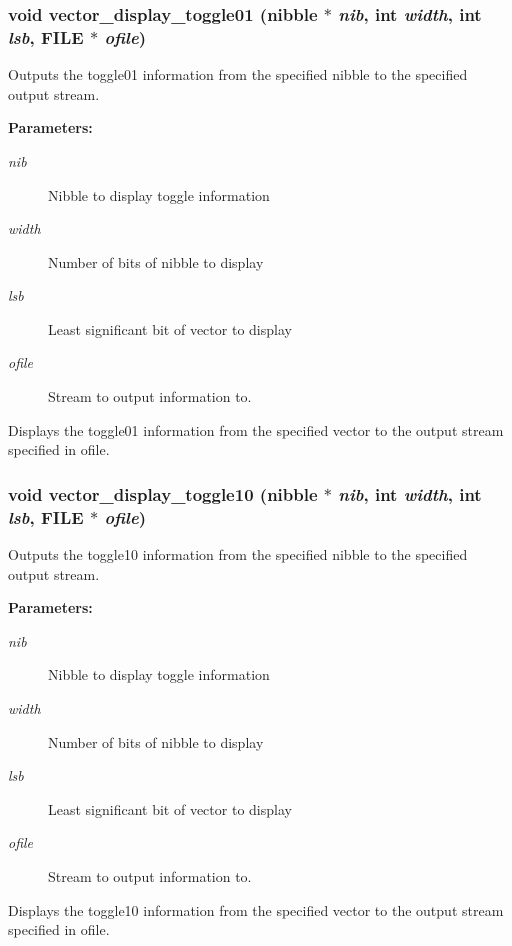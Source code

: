 \subsubsection{\setlength{\rightskip}{0pt plus 5cm}void vector\_\-display\_\-toggle01 ({\bf nibble} $\ast$ {\em nib}, int {\em width}, int {\em lsb}, FILE $\ast$ {\em ofile})}\label{vector_8h_a6}


Outputs the toggle01 information from the specified nibble to the specified output stream.

\begin{Desc}
\item[{\bf Parameters: }]\par
\begin{description}
\item[
{\em nib}]Nibble to display toggle information \item[
{\em width}]Number of bits of nibble to display \item[
{\em lsb}]Least significant bit of vector to display \item[
{\em ofile}]Stream to output information to.

\end{description}
\end{Desc}
Displays the toggle01 information from the specified vector to the output stream specified in ofile. 
\subsubsection{\setlength{\rightskip}{0pt plus 5cm}void vector\_\-display\_\-toggle10 ({\bf nibble} $\ast$ {\em nib}, int {\em width}, int {\em lsb}, FILE $\ast$ {\em ofile})}\label{vector_8h_a7}


Outputs the toggle10 information from the specified nibble to the specified output stream.

\begin{Desc}
\item[{\bf Parameters: }]\par
\begin{description}
\item[
{\em nib}]Nibble to display toggle information \item[
{\em width}]Number of bits of nibble to display \item[
{\em lsb}]Least significant bit of vector to display \item[
{\em ofile}]Stream to output information to.

\end{description}
\end{Desc}
Displays the toggle10 information from the specified vector to the output stream specified in ofile. 

